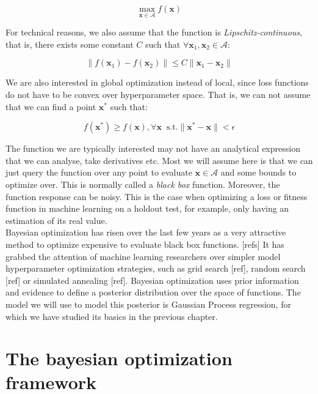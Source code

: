 \documentclass[10pt,a4paper,twoside]{book}
\begin{document}
\begin{equation}
\max_{\boldsymbol{x}\in \mathcal{A}} f(\boldsymbol{x})
\end{equation}

For technical reasons, we also assume that the function is \textit{Lipschitz-continuous}, that is, there exists some constant $C$ such that $\forall \boldsymbol{x}_1, \boldsymbol{x}_2 \in \mathcal{A}$:

\begin{equation}
\lVert f(\boldsymbol{x}_1) - f(\boldsymbol{x}_2) \rVert \leq C \lVert \boldsymbol{x}_1  - \boldsymbol{x}_2\rVert
\end{equation}

We are also interested in global optimization instead of local, since loss functions do not have to be convex over hyperparameter space. That is, we can not assume that we can find a point $\boldsymbol{x^{*}}$ such that:

\begin{equation}
f(\boldsymbol{x}^*) \geq f(\boldsymbol{x}), \forall \boldsymbol{x}\;\; \mathrm{s.t.} \rVert \boldsymbol{x}^* - \boldsymbol{x} \lVert < \epsilon
\end{equation}

The function we are typically interested may not have an analytical expression that we can analyse, take derivatives etc. Most we will assume here is that we can just query the function over any point to evaluate $\boldsymbol{x}\in\mathcal{A}$ and some bounds to optimize over. This is normally called a \textit{black box} function. Moreover, the function response can be noisy. This is the case when optimizing a loss or fitness function in machine learning on a holdout test, for example, only having an estimation of its real value.\\ 

Bayesian optimization has risen over the last few years as a very attractive method to optimize expensive to evaluate black box functions. [refs] It has grabbed the attention of machine learning researchers over simpler model hyperparameter optimization strategies, such as grid search [ref], random search [ref] or simulated annealing [ref]. Bayesian optimization uses prior information and evidence to define a posterior distribution over the space of functions. The model we will use to model this posterior is Gaussian Process regression, for which we have studied its basics in the previous chapter.


\section{The bayesian optimization framework}
\end{document}

